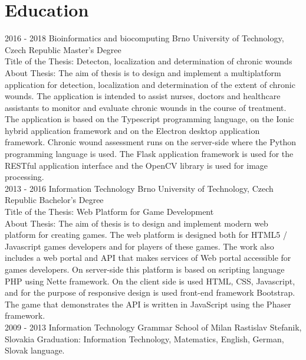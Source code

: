 \documentclass[]{friggeri-cv}
\begin{document}
\section{Education}
\begin{entrylist}
  \entry
    {2016 - 2018}
    {Bioinformatics and biocomputing}
    {Brno University of Technology, Czech Republic}
    {Master's Degree \\
    Title of the Thesis:  Detecton, localization and determination of chronic wounds\\
    About Thesis: The aim of thesis is to design and implement a multiplatform application for detection, localization and determination of the extent of chronic wounds. The application is intended to assist nurses, doctors and healthcare assistants to monitor and evaluate chronic wounds in the course of treatment. The application is based on the Typescript programming language, on the Ionic hybrid application framework and on the Electron desktop application framework. Chronic wound assessment runs on the server-side where the Python programming language is used. The Flask application framework is used for the RESTful application interface and the OpenCV library is used for image processing.\\}
  \entry
    {2013 - 2016}
    {Information Technology}
    {Brno University of Technology, Czech Republic}
    {Bachelor's Degree \\
    Title of the Thesis: Web Platform for Game Development\\
    About Thesis: The aim of thesis is to design and implement modern web platform for creating games. The web platform is designed both for HTML5 / Javascript games developers and for players of these games. The work also includes a web portal and API that makes services of Web portal accessible for games developers. On server-side this platform is based on scripting language PHP using Nette framework. On the client side is used HTML, CSS, Javascript, and for the purpose of responsive design is used front-end framework Bootstrap. The game that demonstrates the API is written in JavaScript using the Phaser framework.\\}
  \entry
    {2009 - 2013}
    {Information Technology}
    {Grammar School of Milan Rastislav Stefanik, Slovakia}
    {Graduation: Information Technology, Matematics, English, German, Slovak language.}
\end{entrylist}
\end{document}
